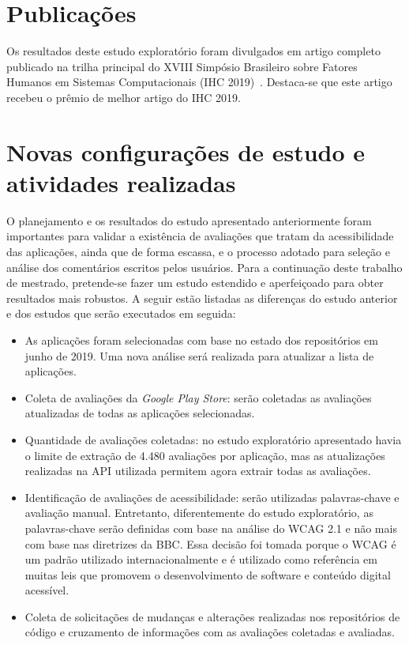 \section{Publicações}

Os resultados deste estudo exploratório foram divulgados em artigo completo publicado na trilha principal do XVIII Simpósio Brasileiro sobre Fatores Humanos em Sistemas Computacionais (IHC 2019)~\cite{ihc2019}. Destaca-se que este artigo recebeu o prêmio de melhor artigo do IHC 2019. 

\section{Novas configurações de estudo e atividades realizadas}

O planejamento e os resultados do estudo apresentado anteriormente foram importantes para validar a existência de avaliações que tratam da acessibilidade das aplicações, ainda que de forma escassa, e o processo adotado para seleção e análise dos comentários escritos pelos usuários. 
Para a continuação deste trabalho de mestrado, pretende-se fazer um estudo estendido e aperfeiçoado para obter resultados mais robustos. A seguir estão listadas as diferenças do estudo anterior e dos estudos que serão executados em seguida:
\begin{itemize}
 \item As aplicações foram selecionadas com base no estado dos repositórios em junho de 2019. Uma nova análise será realizada para atualizar a lista de aplicações.
 \item Coleta de avaliações da \textit{Google Play Store}: serão coletadas as avaliações atualizadas de todas as aplicações selecionadas.
 \item Quantidade de avaliações coletadas: no estudo exploratório apresentado havia o limite de extração de 4.480 avaliações por aplicação, mas as atualizações realizadas na API utilizada permitem agora extrair todas as avaliações.
 \item Identificação de avaliações de acessibilidade: serão utilizadas palavras-chave e avaliação manual. Entretanto, diferentemente do estudo exploratório, as palavras-chave serão definidas com base na análise do WCAG 2.1 e não mais com base nas diretrizes da BBC. Essa decisão foi tomada porque o WCAG é um padrão utilizado internacionalmente e é utilizado como referência em muitas leis que promovem o desenvolvimento de software e conteúdo digital acessível. 
 \item Coleta de solicitações de mudanças e alterações realizadas nos repositórios de código e cruzamento de informações com as avaliações coletadas e avaliadas.
 
\end{itemize}


